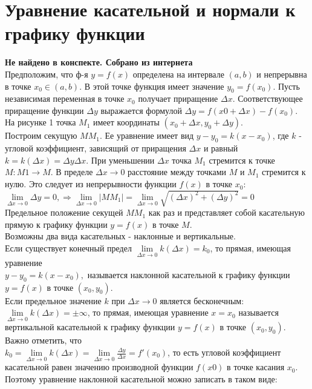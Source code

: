 \documentclass[oneside]{book}
\begin{document}
\chapter{Уравнение касательной и нормали к графику функции}
\textbf{Не найдено в конспекте. Собрано из интернета}\\
Предположим, что ф-я $y=f(x)$ определена на интервале $(a,b)$ и непрерывна в точке $x_0 \in (a,b)$. В этой точке функция имеет значение $y_0=f(x_0)$.
Пусть независимая переменная в точке $x_0$ получает приращение $\Delta x$. Соответствующее приращение функции $\Delta y$ выражается формулой $\Delta y = f(x0+ \Delta x) - f(x_0)$.
На рисунке 1 точка $M_1$ имеет координаты $(x_0+\Delta x,y_0+\Delta y)$.\\
 Построим секущую $MM_1$. Ее уравнение имеет вид $y - y_0=k(x-x_0)$, где $k$ - угловой коэффициент, зависящий от приращения $\Delta x$
   и равный $k=k(\Delta x)=\Delta y\Delta x$. При уменьшении $\Delta x$ точка $M_1$ стремится к точке $M: M1\rightarrow M$. В пределе $\Delta x\rightarrow 0$ расстояние между точками $M$ и $M_1$ стремится к нулю. Это следует из непрерывности функции $f(x)$ в точке $x_0$:\\
   $\lim \limits_{\Delta x \rightarrow 0}\Delta y = 0, \Rightarrow \lim \limits_{\Delta x \rightarrow 0}|MM_1|=\lim \limits_{\Delta x \rightarrow 0}\sqrt{(\Delta x)^2 + (\Delta y)^2}=0$\\
   Предельное положение секущей $MM_1$ как раз и представляет собой касательную прямую к графику функции $y=f(x)$ в точке $M$.\\
   Возможны два вида касательных - наклонные и вертикальные. \\
   Если существует конечный предел $\lim \limits_{\Delta x \rightarrow 0}k(\Delta x)=k_0$, то прямая, имеющая уравнение\\
   $y-y_0=k(x-x_0),$ называется наклонной касательной к графику функции $y=f(x)$ в точке $(x_0,y_0)$.\\
   Если предельное значение $k$ при $\Delta x\rightarrow 0$ является бесконечным: $\lim \limits_{\Delta x \rightarrow 0}k(\Delta x)=\pm \infty$, то прямая, имеющая уравнение $x=x_0$ называется вертикальной касательной к графику функции $y=f(x)$ в точке $(x_0,y_0)$.\\
   Важно отметить, что 
   \\$k_0=\lim \limits_{\Delta x \rightarrow 0}k(\Delta x)=\lim \limits_{\Delta x \rightarrow 0}\frac{\Delta y}{\Delta x}=f'(x_0)$, то есть угловой коэффициент касательной равен значению производной функции $f(x0)$ в точке касания $x_0$. Поэтому уравнение наклонной касательной можно записать в таком виде: \\
\end{document}
